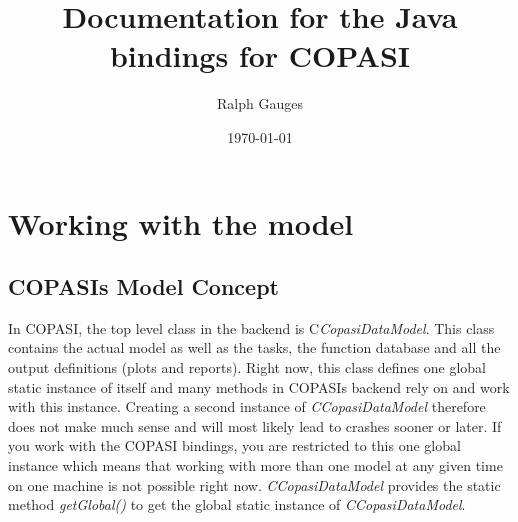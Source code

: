 \documentclass[a4,12pt]{article}
\begin{document}

\title{Documentation for the Java bindings for COPASI}
\author{Ralph Gauges}
\date{\today}
\maketitle
\parindent=0cm
\section{Working with the model}
\subsection{COPASIs Model Concept}
In COPASI, the top level class in the backend is C\textit{CopasiDataModel}. This class contains the actual model as well as the tasks, the function database and all the output definitions (plots and reports). Right now, this class defines one global static instance of itself and many methods in COPASIs backend rely on and work with this instance. Creating a second instance  of \textit{CCopasiDataModel} therefore does not make much sense and will most likely lead to crashes sooner or later. If you work with the COPASI bindings, you are restricted to this one global instance which means that working with more than one model at any given time on one machine is not possible right now.
\textit{CCopasiDataModel} provides the static method \textit{getGlobal()} to get the global static instance of \textit{CCopasiDataModel}.
\end{document}

